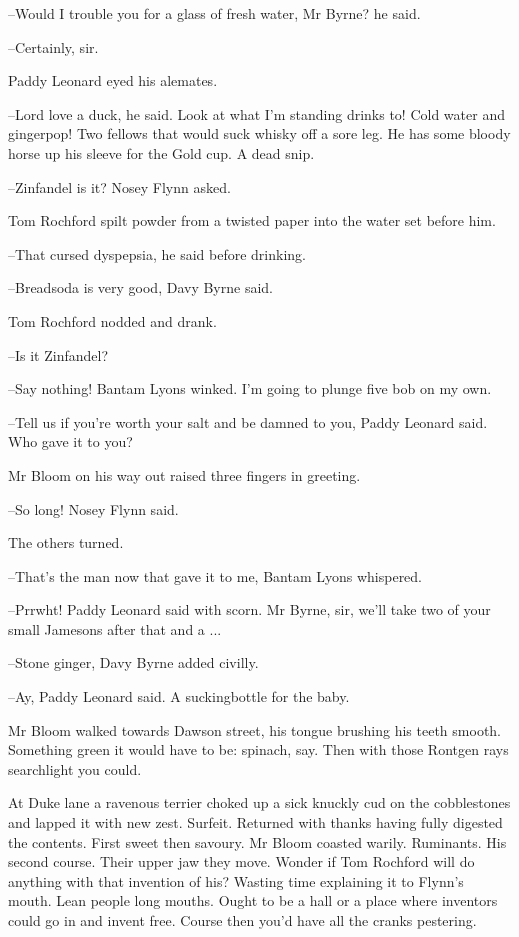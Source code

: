 --Would I trouble you for a glass of fresh water, Mr Byrne? he said.

--Certainly, sir.

Paddy Leonard eyed his alemates.

--Lord love a duck, he said. Look at what I'm standing drinks to! Cold
water and gingerpop! Two fellows that would suck whisky off a sore leg.
He has some bloody horse up his sleeve for the Gold cup. A dead snip.

--Zinfandel is it? Nosey Flynn asked.

Tom Rochford spilt powder from a twisted paper into the water set before
him.

--That cursed dyspepsia, he said before drinking.

--Breadsoda is very good, Davy Byrne said.

Tom Rochford nodded and drank.

--Is it Zinfandel?

--Say nothing! Bantam Lyons winked. I'm going to plunge five bob on my
own.

--Tell us if you're worth your salt and be damned to you, Paddy Leonard
said. Who gave it to you?

Mr Bloom on his way out raised three fingers in greeting.

--So long! Nosey Flynn said.

The others turned.

--That's the man now that gave it to me, Bantam Lyons whispered.

--Prrwht! Paddy Leonard said with scorn. Mr Byrne, sir, we'll take two of
your small Jamesons after that and a ...

--Stone ginger, Davy Byrne added civilly.

--Ay, Paddy Leonard said. A suckingbottle for the baby.

Mr Bloom walked towards Dawson street, his tongue brushing his teeth
smooth. Something green it would have to be: spinach, say. Then with
those Rontgen rays searchlight you could.

At Duke lane a ravenous terrier choked up a sick knuckly cud on the
cobblestones and lapped it with new zest. Surfeit. Returned with thanks
having fully digested the contents. First sweet then savoury. Mr Bloom
coasted warily. Ruminants. His second course. Their upper jaw they move.
Wonder if Tom Rochford will do anything with that invention of his?
Wasting time explaining it to Flynn's mouth. Lean people long mouths.
Ought to be a hall or a place where inventors could go in and invent
free. Course then you'd have all the cranks pestering.

